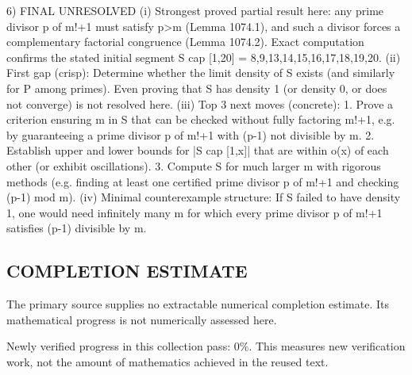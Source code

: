 6) FINAL
UNRESOLVED
(i) Strongest proved partial result here: any prime divisor p of m!+1 must satisfy p>m (Lemma 1074.1), and such a divisor forces a complementary factorial congruence (Lemma 1074.2). Exact computation confirms the stated initial segment S cap [1,20] = {8,9,13,14,15,16,17,18,19,20}.
(ii) First gap (crisp): Determine whether the limit density of S exists (and similarly for P among primes). Even proving that S has density 1 (or density 0, or does not converge) is not resolved here.
(iii) Top 3 next moves (concrete):
  1. Prove a criterion ensuring m in S that can be checked without fully factoring m!+1, e.g. by guaranteeing a prime divisor p of m!+1 with (p-1) not divisible by m.
  2. Establish upper and lower bounds for |S cap [1,x]| that are within o(x) of each other (or exhibit oscillations).
  3. Compute S for much larger m with rigorous methods (e.g. finding at least one certified prime divisor p of m!+1 and checking (p-1) mod m).
(iv) Minimal counterexample structure: If S failed to have density 1, one would need infinitely many m for which every prime divisor p of m!+1 satisfies (p-1) divisible by m.




\subsection*{COMPLETION ESTIMATE}
The primary source supplies no extractable numerical completion estimate. Its mathematical progress is not numerically assessed here.

Newly verified progress in this collection pass: $0\%$. This measures new verification work, not the amount of mathematics achieved in the reused text.
